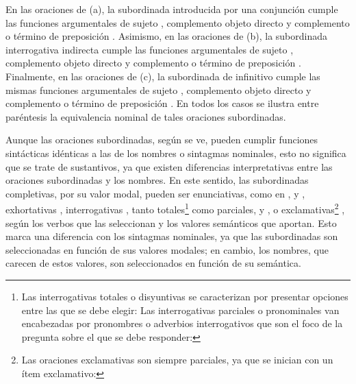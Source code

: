 En las oraciones de (a), la subordinada introducida por una conjunción cumple las
funciones argumentales de sujeto , complemento objeto directo
 y complemento o término de preposición .
Asimismo, en las oraciones de (b), la subordinada interrogativa indirecta cumple
las funciones argumentales de sujeto , complemento objeto
directo  y complemento o término de preposición
. Finalmente, en las oraciones de (c), la subordinada de
infinitivo cumple las mismas funciones argumentales de sujeto
, complemento objeto directo  y complemento
o término de preposición . En todos los casos se ilustra entre
paréntesis la equivalencia nominal de tales oraciones subordinadas.

Aunque las oraciones subordinadas, según se ve, pueden cumplir funciones
sintácticas idénticas a las de los nombres o sintagmas nominales, esto no
significa que se trate de sustantivos, ya que existen diferencias interpretativas
entre las oraciones subordinadas y los nombres. En este sentido, las
subordinadas completivas, por su valor modal, pueden ser enunciativas, como en
,  y , exhortativas
, interrogativas , tanto
totales\footnote{Las interrogativas totales o disyuntivas se caracterizan por
presentar opciones entre las que se debe elegir:  Las interrogativas parciales o
pronominales van encabezadas por pronombres o adverbios interrogativos que son el
foco de la pregunta sobre el que se debe responder: }  como parciales,
 y , o
exclamativas\footnote{\label{fn:13-exclamativas}Las oraciones exclamativas son
siempre parciales, ya que se inician con un ítem exclamativo: } , según los verbos que las
seleccionan y los valores semánticos que aportan. Esto marca una diferencia con
los sintagmas nominales, ya que las subordinadas son seleccionadas en función de
sus valores modales; en cambio, los nombres, que carecen de estos valores, son
seleccionados en función de su semántica.

